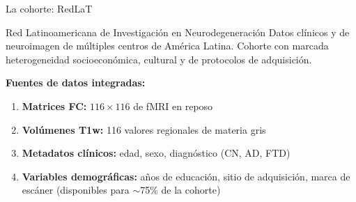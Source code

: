 \documentclass[aspectratio=169, 11pt]{beamer}
\begin{document}
\begin{frame}{La cohorte: RedLaT}
  \begin{block}{Red Latinoamericana de Investigación en Neurodegeneración}
    Datos clínicos y de neuroimagen de múltiples centros de América Latina. Cohorte con marcada heterogeneidad socioeconómica, cultural y de protocolos de adquisición.
  \end{block}

  \vspace{0.2cm}
  \textbf{Fuentes de datos integradas:}
  \begin{enumerate}
    \item \textbf{Matrices FC:} $116 \times 116$ de fMRI en reposo
    \item \textbf{Volúmenes T1w:} 116 valores regionales de materia gris
    \item \textbf{Metadatos clínicos:} edad, sexo, diagnóstico (CN, AD, FTD)
    \item \textbf{Variables demográficas:} años de educación, sitio de adquisición, marca de escáner (disponibles para $\sim$75\% de la cohorte)
  \end{enumerate}

  \vspace{0.3cm}
  \centering
  \shorthandoff{>}
  \shorthandon{>}
\end{frame}
\end{document}
